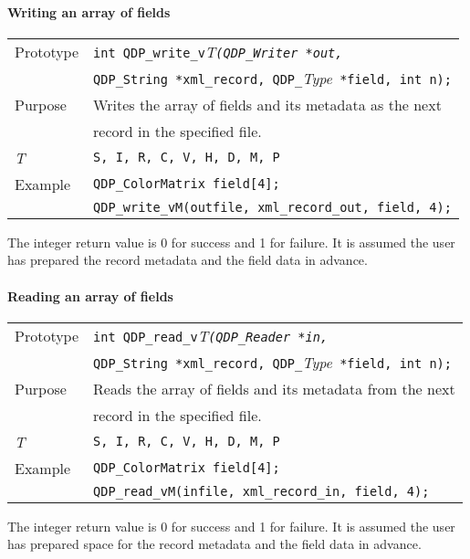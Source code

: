 \documentclass{article}
\newcommand{\allTypes}{{\tt S, I, R, C, V, H, D, M, P}}
\newcommand{\itt}{\it T}
\newcommand{\QMDhandle}{{\tt QDP\_String }}
\begin{document}
\paragraph{Writing an array of fields}

\begin{flushleft}
  \begin{tabular}{|l|l|}
  \hline
  Prototype      & \verb|int QDP_write_v|\itt\verb|(QDP_Writer *out, |\\
                 & \QMDhandle \verb|*xml_record, QDP_|{\it Type}\verb| *field, int n);|\\
    \hline
  Purpose        & Writes the array of fields and its metadata as the next \\
                 & record in the specified file. \\
\hline
  \itt     & \allTypes \\
   \hline
  Example  & \verb|QDP_ColorMatrix field[4];| \\
           & \verb|QDP_write_vM(outfile, xml_record_out, field, 4);| \\
   \hline
 \end{tabular}
\end{flushleft}
%
The integer return value is 0 for success and 1 for failure.  It is
assumed the user has prepared the record metadata and the field data
in advance.

\paragraph{Reading an array of fields}

\begin{flushleft}
  \begin{tabular}{|l|l|}
  \hline
  Prototype      & \verb|int QDP_read_v|\itt\verb|(QDP_Reader *in, |\\
                 &   \QMDhandle \verb|*xml_record, QDP_|{\it Type}\verb| *field, int n);|\\
    \hline
  Purpose        & Reads the array of fields and its metadata from the next \\
                 & record in the specified file. \\
\hline
  \itt     & \allTypes \\
   \hline
  Example  & \verb|QDP_ColorMatrix field[4];| \\
           & \verb|QDP_read_vM(infile, xml_record_in, field, 4);| \\
   \hline
 \end{tabular}
\end{flushleft}
%
The integer return value is 0 for success and 1 for failure.  It is
assumed the user has prepared space for the record metadata and the
field data in advance.
\end{document}
